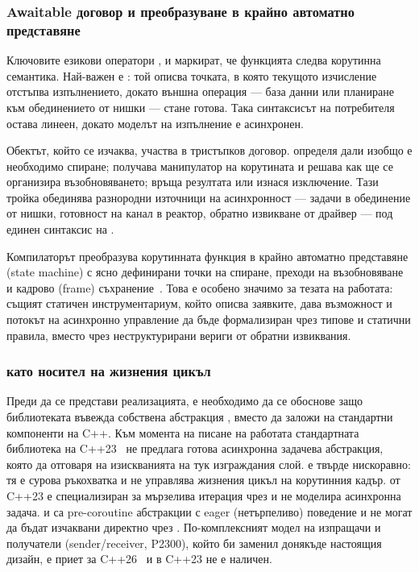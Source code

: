 \subsubsection{Awaitable договор и преобразуване в крайно автоматно представяне}

Ключовите езикови оператори ,  и  маркират, че функцията следва корутинна семантика. Най-важен е : той описва точката, в която текущото изчисление отстъпва изпълнението, докато външна операция --- база данни или планиране към обединението от нишки --- стане готова. Така синтаксисът на потребителя остава линеен, докато моделът на изпълнение е асинхронен.

Обектът, който се изчаква, участва в тристъпков договор.  определя дали изобщо е необходимо спиране;  получава манипулатор на корутината и решава как ще се организира възобновяването;  връща резултата или изнася изключение. Тази тройка обединява разнородни източници на асинхронност --- задачи в обединение от нишки, готовност на канал в реактор, обратно извикване от драйвер --- под единен синтаксис на .

Компилаторът преобразува корутинната функция в крайно автоматно представяне (state machine) с ясно дефинирани точки на спиране, преходи на възобновяване и кадрово (frame) съхранение~\cite{p0912r5,p1063r0}. Това е особено значимо за тезата на работата: същият статичен инструментариум, който описва заявките, дава възможност и потокът на асинхронно управление да бъде формализиран чрез типове и статични правила, вместо чрез неструктурирани вериги от обратни извиквания.

\subsubsection{ като носител на жизнения цикъл}

Преди да се представи реализацията, е необходимо да се обоснове защо библиотеката въвежда собствена абстракция , вместо да заложи на стандартни компоненти на C++. Към момента на писане на работата стандартната библиотека на C++23~\cite{cpp23standard} не предлага готова асинхронна задачева абстракция, която да отговаря на изискванията на тук изграждания слой.  е твърде нискоравно: тя е сурова ръкохватка и не управлява жизнения цикъл на корутинния кадър.  от C++23 е специализиран за мързелива итерация чрез  и не моделира асинхронна задача.  и  са pre-coroutine абстракции с eager (нетърпеливо) поведение и не могат да бъдат изчаквани директно чрез . По-комплексният модел на изпращачи и получатели (sender/receiver, P2300), който би заменил донякъде настоящия дизайн, е приет за C++26~\cite{p2300} и в C++23 не е наличен.

